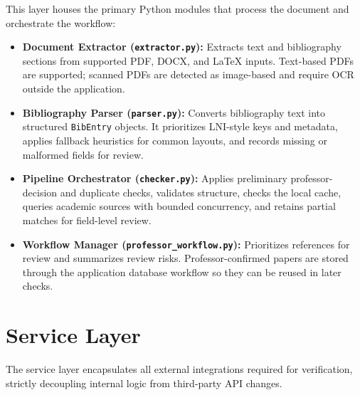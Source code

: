 \documentclass[12pt,a4paper,oneside]{report}
\begin{document}
This layer houses the primary Python modules that process the document and orchestrate the workflow:

\begin{itemize}
    \item \textbf{Document Extractor (\texttt{extractor.py}):} Extracts text and bibliography sections from supported PDF, DOCX, and LaTeX inputs. Text-based PDFs are supported; scanned PDFs are detected as image-based and require OCR outside the application.
    \item \textbf{Bibliography Parser (\texttt{parser.py}):} Converts bibliography text into structured \texttt{BibEntry} objects. It prioritizes LNI-style keys and metadata, applies fallback heuristics for common layouts, and records missing or malformed fields for review.
    \item \textbf{Pipeline Orchestrator (\texttt{checker.py}):} Applies preliminary professor-decision and duplicate checks, validates structure, checks the local cache, queries academic sources with bounded concurrency, and retains partial matches for field-level review.
    \item \textbf{Workflow Manager (\texttt{professor\_workflow.py}):} Prioritizes references for review and summarizes review risks. Professor-confirmed papers are stored through the application database workflow so they can be reused in later checks.
\end{itemize}

\section{Service Layer}

The service layer encapsulates all external integrations required for verification, strictly decoupling internal logic from third-party API changes.
\end{document}
